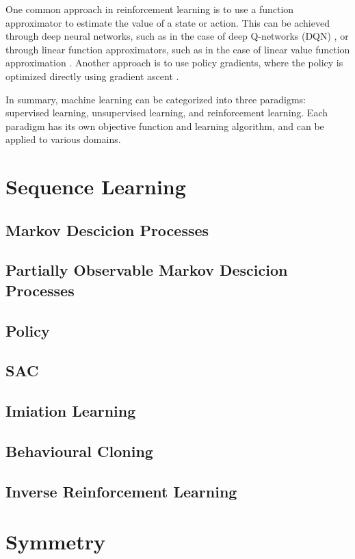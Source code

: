 One common approach in reinforcement learning is to use a function approximator to estimate the value of a state or action. 
This can be achieved through deep neural networks, such as in the case of deep Q-networks (DQN) \cite{mnih2015human}, or through 
linear function approximators, such as in the case of linear value function approximation \cite{sutton2018reinforcement}. Another approach 
is to use policy gradients, where the policy is optimized directly using gradient ascent \cite{sutton2000policy}.

In summary, machine learning can be categorized into three paradigms: supervised learning, unsupervised learning, 
and reinforcement learning. Each paradigm has its own objective function and learning algorithm, and can be applied to 
various domains.

\section{Sequence Learning}
\subsection{Markov Descicion Processes}
\subsection{Partially Observable Markov Descicion Processes}
\subsection{Policy}

\subsection{SAC}
\subsection{Imiation Learning}
\subsection{Behavioural Cloning}
\subsection{Inverse Reinforcement Learning}
\section{Symmetry}
